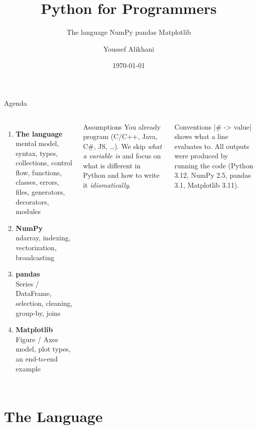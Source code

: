 \documentclass[aspectratio=169,9pt]{beamer}
\title{Python for Programmers}
\subtitle{The language \textperiodcentered{} NumPy
          \textperiodcentered{} pandas \textperiodcentered{} Matplotlib}
\author{Youssef Alikhani}
\date{\today}
\newcommand{\hint}[1]{{\small\color{ink2}#1}}  %
\begin{document}
\maketitle

\begin{frame}[fragile]{Agenda}
\begin{columns}[T]
\begin{enumerate}\setlength\itemsep{6pt}
  \item \textbf{The language}\\
        \hint{mental model, syntax, types, collections, control flow,
        functions, classes, errors, files, generators, decorators, modules}
  \item \textbf{NumPy}\\
        \hint{ndarray, indexing, vectorization, broadcasting}
  \item \textbf{pandas}\\
        \hint{Series / DataFrame, selection, cleaning, group-by, joins}
  \item \textbf{Matplotlib}\\
        \hint{Figure / Axes model, plot types, an end-to-end example}
\end{enumerate}
\begin{exampleblock}{Assumptions}
You already program (C/C++, Java, C\#, JS, \ldots). We skip
\emph{what a variable is} and focus on \alert{what is different in
Python} and how to write it \emph{idiomatically}.
\end{exampleblock}
\begin{block}{Conventions}
|# -> value| shows what a line evaluates to.
All outputs were produced by running the code
(Python 3.12, NumPy 2.5, pandas 3.1, Matplotlib 3.11).
\end{block}
\end{columns}
\end{frame}

\section{The Language}
\end{document}
